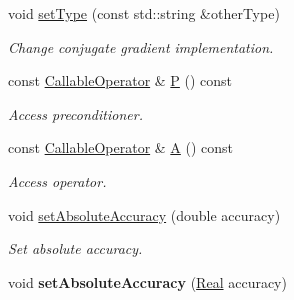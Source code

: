 \begin{DoxyCompactItemize}
void \hyperlink{classSpacy_1_1CG_1_1Solver_a4009b5e2062e4930f0cfdc9d979c7b80_a4009b5e2062e4930f0cfdc9d979c7b80}{set\+Type} (const std\+::string \&other\+Type)
\begin{DoxyCompactList}\small\item\em Change conjugate gradient implementation. \end{DoxyCompactList}\item 
const \hyperlink{group__SpacyGroup_ga2b74020d806ad800795cdd97dab3466f_ga2b74020d806ad800795cdd97dab3466f}{Callable\+Operator} \& \hyperlink{classSpacy_1_1CG_1_1Solver_a929d2b9deecfd96ef7efb8097e567f37_a929d2b9deecfd96ef7efb8097e567f37}{P} () const 
\begin{DoxyCompactList}\small\item\em Access preconditioner. \end{DoxyCompactList}\item 
const \hyperlink{group__SpacyGroup_ga2b74020d806ad800795cdd97dab3466f_ga2b74020d806ad800795cdd97dab3466f}{Callable\+Operator} \& \hyperlink{classSpacy_1_1CG_1_1Solver_a9b0fa76350c42fb60b2fbeb40b343fa2_a9b0fa76350c42fb60b2fbeb40b343fa2}{A} () const 
\begin{DoxyCompactList}\small\item\em Access operator. \end{DoxyCompactList}\item 
void \hyperlink{classSpacy_1_1Mixin_1_1AbsoluteAccuracy_a71cfcdc0c504be63c18c3e78df157738_a71cfcdc0c504be63c18c3e78df157738}{set\+Absolute\+Accuracy} (double accuracy)
\begin{DoxyCompactList}\small\item\em Set absolute accuracy. \end{DoxyCompactList}\item 
\hypertarget{classSpacy_1_1Mixin_1_1AbsoluteAccuracy_ad099a4a0a770133b56acaaf8783d4ba6}{}void {\bfseries set\+Absolute\+Accuracy} (\hyperlink{classSpacy_1_1Real}{Real} accuracy)\label{classSpacy_1_1Mixin_1_1AbsoluteAccuracy_ad099a4a0a770133b56acaaf8783d4ba6}


\end{DoxyCompactItemize}
